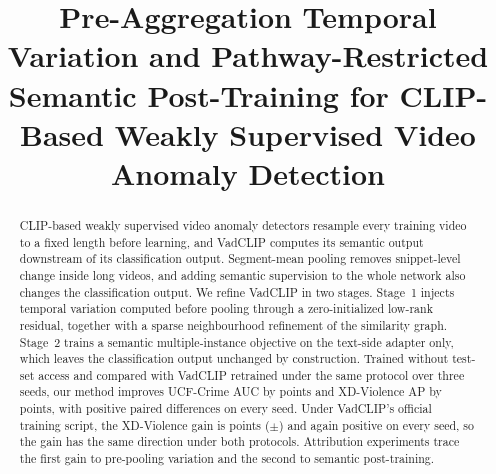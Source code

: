 \documentclass[conference]{IEEEtran}
\title{Pre-Aggregation Temporal Variation and Pathway-Restricted Semantic Post-Training for CLIP-Based Weakly Supervised Video Anomaly Detection}
\author{\IEEEauthorblockN{Anonymous}}
\begin{document}
\maketitle

\begin{abstract}
CLIP-based weakly supervised video anomaly detectors resample every training video to a fixed length before learning, and VadCLIP computes its semantic output downstream of its classification output. Segment-mean pooling removes snippet-level change inside long videos, and adding semantic supervision to the whole network also changes the classification output. We refine VadCLIP in two stages. Stage~1 injects temporal variation computed before pooling through a zero-initialized low-rank residual, together with a sparse neighbourhood refinement of the similarity graph. Stage~2 trains a semantic multiple-instance objective on the text-side adapter only, which leaves the classification output unchanged by construction. Trained without test-set access and compared with VadCLIP retrained under the same protocol over three seeds, our method improves UCF-Crime AUC by \ucfGainMean{} points and XD-Violence AP by \xdGainMean{} points, with positive paired differences on every seed. Under VadCLIP's official training script, the XD-Violence gain is \offGainMean{} points ($\pm$\offGainSd{}) and again positive on every seed, so the gain has the same direction under both protocols. Attribution experiments trace the first gain to pre-pooling variation and the second to semantic post-training.
\end{abstract}












\end{document}

